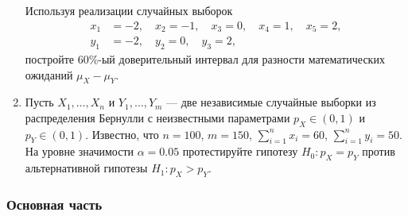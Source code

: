 \begin{enumerate}
Используя реализации случайных выборок
\begin{align*}
x_{1} &= -2, \quad x_{2} = -1, \quad x_{3} = 0, \quad x_{4} = 1, \quad x_{5} = 2, \\
y_{1} &= -2, \quad y_{2} = 0, \quad y_{3} = 2,
\end{align*}
постройте 60\%-ый доверительный интервал для разности математических ожиданий
$\mu_{X} - \mu_{Y}$.

\item Пусть $X_{1}, \ldots, X_{n}$ и $Y_{1}, \ldots, Y_{m}$ — две независимые случайные выборки из распределения Бернулли с неизвестными параметрами $p_{X}\in(0,1)$ и $p_{Y}\in(0,1)$. Известно, что $n=100$, $m=150$, $\sum_{i=1}^{n}x_{i}=60$, $\sum_{i=1}^{n}y_{i}=50$. На уровне значимости $\alpha=0.05$ протестируйте гипотезу $H_{0}:p_{X}=p_{Y}$ против альтернативной гипотезы $H_{1}:p_{X}>p_{Y}$.


\end{enumerate}

\subsubsection*{Основная часть}


